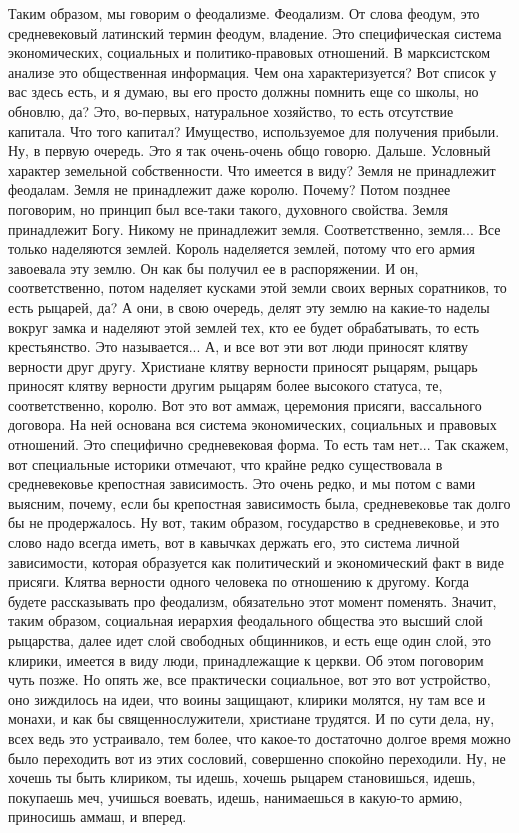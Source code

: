 Таким образом, мы говорим о
феодализме. Феодализм. От слова феодум, это средневековый латинский термин
феодум, владение. Это специфическая система экономических, социальных и
политико-правовых отношений. В марксистском анализе это общественная информация.
Чем она характеризуется? Вот список у вас здесь есть, и я думаю, вы его просто
должны помнить еще со школы, но обновлю, да? Это, во-первых, натуральное
хозяйство, то есть отсутствие капитала. Что того капитал? Имущество,
используемое для получения прибыли. Ну, в первую очередь. Это я так очень-очень
общо говорю. Дальше. Условный характер земельной собственности. Что имеется в
виду? Земля не принадлежит феодалам. Земля не принадлежит даже королю. Почему?
Потом позднее поговорим, но принцип был все-таки такого, духовного свойства.
Земля принадлежит Богу. Никому не принадлежит земля. Соответственно, земля...
Все только наделяются землей. Король наделяется землей, потому что его армия
завоевала эту землю. Он как бы получил ее в распоряжении. И он, соответственно,
потом наделяет кусками этой земли своих верных соратников, то есть рыцарей, да?
А они, в свою очередь, делят эту землю на какие-то наделы вокруг замка и
наделяют этой землей тех, кто ее будет обрабатывать, то есть крестьянство. Это
называется... А, и все вот эти вот люди приносят клятву верности друг другу.
Христиане клятву верности приносят рыцарям, рыцарь приносят клятву верности
другим рыцарям более высокого статуса, те, соответственно, королю. Вот это вот
аммаж, церемония присяги, вассального договора. На ней основана вся система
экономических, социальных и правовых отношений. Это специфично средневековая
форма. То есть там нет... Так скажем, вот специальные историки отмечают, что
крайне редко существовала в средневековье крепостная зависимость. Это очень
редко, и мы потом с вами выясним, почему, если бы крепостная зависимость была,
средневековье так долго бы не продержалось. Ну вот, таким образом, государство в
средневековье, и это слово надо всегда иметь, вот в кавычках держать его, это
система личной зависимости, которая образуется как политический и экономический
факт в виде присяги. Клятва верности одного человека по отношению к другому.
Когда будете рассказывать про феодализм, обязательно этот момент поменять.
Значит, таким образом, социальная иерархия феодального общества это высший слой
рыцарства, далее идет слой свободных общинников, и есть еще один слой, это
клирики, имеется в виду люди, принадлежащие к церкви. Об этом поговорим чуть
позже. Но опять же, все практически социальное, вот это вот устройство, оно
зиждилось на идеи, что воины защищают, клирики молятся, ну там все и монахи, и
как бы священнослужители, христиане трудятся. И по сути дела, ну, всех ведь это
устраивало, тем более, что какое-то достаточно долгое время можно было
переходить вот из этих сословий, совершенно спокойно переходили. Ну, не хочешь
ты быть клириком, ты идешь, хочешь рыцарем становишься, идешь, покупаешь меч,
учишься воевать, идешь, нанимаешься в какую-то армию, приносишь аммаш, и вперед.

